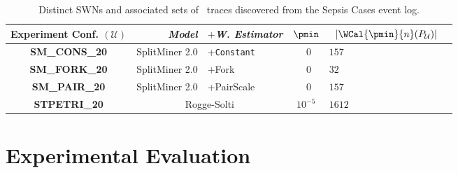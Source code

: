 
\begin{table}[!t]
	\caption{Distinct SWNs and associated sets of \unravelled\ traces discovered from the Sepsis Cases event log.}\label{tab:dataset}
	\centering
		\begin{tabular}{crl||cl|c}
			\toprule
			\textbf{Experiment Conf.} $(\mathcal{U})$ & \textit{Model} & $+$\textit{W. Estimator} & $\pmin$& $\;\;|\WCal{\pmin}{n}(P_{\mathcal{U}})|$ \\
			\midrule
			
			\textbf{SM\_CONS\_20} &SplitMiner 2.0  \cite{AugustoCDRP19}       & +\texttt{Constant} &  $\;\;0$ & $157$  \\
			
			\textbf{SM\_FORK\_20} & SplitMiner 2.0  \cite{AugustoCDRP19}      & +Fork \cite{spdwe} &  $\;\;0$ & $32$  \\
			
			
			\textbf{SM\_PAIR\_20} & SplitMiner 2.0  \cite{AugustoCDRP19}      & +PairScale \cite{spdwe} &  $\;\;0$ & $157$ \\
			
			\textbf{STPETRI\_20} & \multicolumn{2}{c||}{Rogge-Solti \cite{RoggeSoltiAW13}} &  $10^{-5}$ & $1612$ \\
			\bottomrule
		\end{tabular}
\end{table}


\section{Experimental Evaluation}\label{sec:exp}

